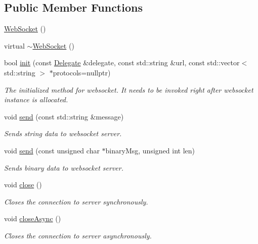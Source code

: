 \subsection*{Public Member Functions}
\begin{DoxyCompactItemize}
\item 
\hyperlink{classnetwork_1_1WebSocket_abecb17a816adaef8b204c3170f96b42c}{Web\+Socket} ()
\item 
virtual \hyperlink{classnetwork_1_1WebSocket_a5a0b1e884d47e86d9415c126f6d9ab0a}{$\sim$\+Web\+Socket} ()
\item 
bool \hyperlink{classnetwork_1_1WebSocket_ad5b92ee6f7b6bf4f29e05de51813c05f}{init} (const \hyperlink{classnetwork_1_1WebSocket_1_1Delegate}{Delegate} \&delegate, const std\+::string \&url, const std\+::vector$<$ std\+::string $>$ $\ast$protocols=nullptr)
\begin{DoxyCompactList}\small\item\em The initialized method for websocket. It needs to be invoked right after websocket instance is allocated. \end{DoxyCompactList}\item 
void \hyperlink{classnetwork_1_1WebSocket_af7c47e5f256fe235baac117417f05410}{send} (const std\+::string \&message)
\begin{DoxyCompactList}\small\item\em Sends string data to websocket server. \end{DoxyCompactList}\item 
void \hyperlink{classnetwork_1_1WebSocket_aca55172b70d11ae5e7456853d61f2c63}{send} (const unsigned char $\ast$binary\+Msg, unsigned int len)
\begin{DoxyCompactList}\small\item\em Sends binary data to websocket server. \end{DoxyCompactList}\item 
void \hyperlink{classnetwork_1_1WebSocket_ac0addc7ad7951f4bd10424154da7477a}{close} ()
\begin{DoxyCompactList}\small\item\em Closes the connection to server synchronously. \end{DoxyCompactList}\item 
void \hyperlink{classnetwork_1_1WebSocket_a39bdbc192e1e9120f042b695ac0344bc}{close\+Async} ()
\begin{DoxyCompactList}\small\item\em Closes the connection to server asynchronously. \end{DoxyCompactList}\item 

\end{DoxyCompactItemize}
